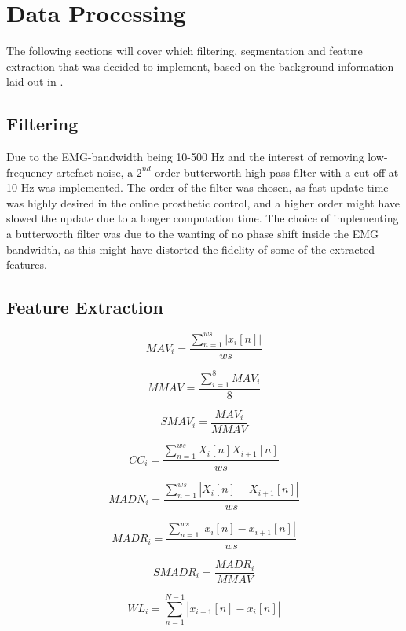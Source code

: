 \section{Data Processing}
The following sections will cover which filtering, segmentation and feature extraction that was decided to implement, based on the background information laid out in . 

\subsection{Filtering}
Due to the EMG-bandwidth being 10-500 Hz and the interest of removing low-frequency artefact noise, a $2^{nd}$ order butterworth high-pass filter with a cut-off at 10 Hz was implemented. The order of the filter was chosen, as fast update time was highly desired in the online prosthetic control, and a higher order might have slowed the update due to a longer computation time. The choice of implementing a butterworth filter was due to the wanting of no phase shift inside the EMG bandwidth, as this might have distorted the fidelity of some of the extracted features. 

\subsection{Feature Extraction}



\begin{equation} \label{eq:MAV}
MAV_i=\frac{\sum\limits_{n=1}^{ws}|x_i[n]|}{ws}
\end{equation}



\begin{equation} \label{eq:MMAV}
MMAV=\frac{\sum\limits_{i=1}^{8}MAV_i}{8}
\end{equation}



\begin{equation} \label{eq:SMAV}
SMAV_i=\frac{MAV_i}{MMAV}
\end{equation}



\begin{equation} \label{eq:CC}
CC_i=\frac{\sum\limits_{n=1}^{ws}X_i[n]X_{i+1}[n]}{ws}
\end{equation}



\begin{equation} \label{eq:MADN}
MADN_i=\frac{\sum\limits_{n=1}^{ws}|X_i[n]-X_{i+1}[n]|}{ws}
\end{equation}



\begin{equation} \label{eq:MADR}
MADR_i=\frac{\sum\limits_{n=1}^{ws}|x_i[n]-x_{i+1}[n]|}{ws}
\end{equation}



\begin{equation} \label{eq:MMADR}
SMADR_i=\frac{MADR_i}{MMAV}
\end{equation}



\begin{equation} \label{eq:WL}
WL_i=\sum\limits_{n=1}^{N-1}|x_{i+1}[n]-x_i[n]|
\end{equation}



